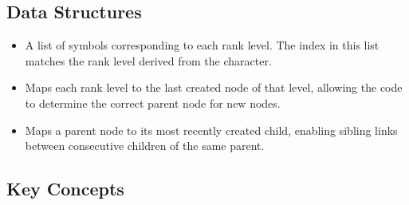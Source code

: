 \subsection{Data Structures}

\begin{itemize}
        \item  {} A list of symbols corresponding to each rank level. The index in this list matches the rank level derived from the character.
        \item  {} Maps each rank level to the last created node of that level, allowing the code to determine the correct parent node for new nodes.
        \item  {} Maps a parent node to its most recently created child, enabling sibling links between consecutive children of the same parent.
    \end{itemize}


\subsection{Key Concepts}

